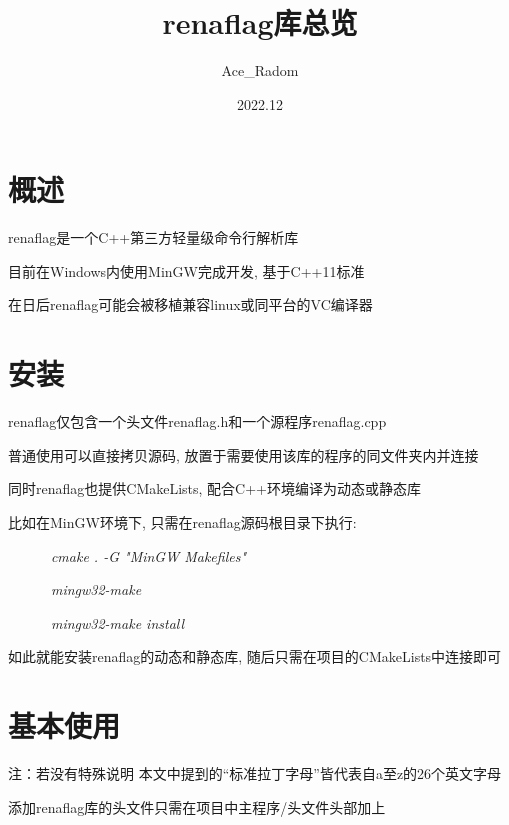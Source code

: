 \documentclass[12pt , a4paper , oneside]{ctexart}
\title{renaflag库总览}
\author{Ace\_Radom}
\date{2022.12}
\begin{document}
    \maketitle

    \newpage

    \section{概述}

        renaflag是一个C++第三方轻量级命令行解析库
        
        目前在Windows内使用MinGW完成开发, 基于C++11标准

        在日后renaflag可能会被移植兼容linux或同平台的VC编译器

    \newpage

    \section{安装}

        renaflag仅包含一个头文件\textcolor{file}{renaflag.h}和一个源程序\textcolor{file}{renaflag.cpp}

        普通使用可以直接拷贝源码, 放置于需要使用该库的程序的同文件夹内并连接

        同时renaflag也提供CMakeLists, 配合C++环境编译为动态或静态库

        比如在MinGW环境下, 只需在renaflag源码根目录下执行:

        \textit{\ \ \ \ \ \ cmake . -G "MinGW Makefiles"}

        \textit{\ \ \ \ \ \ mingw32-make}
        
        \textit{\ \ \ \ \ \ mingw32-make install}

        如此就能安装renaflag的动态和静态库, 随后只需在项目的CMakeLists中连接即可
    
    \newpage

    \section{基本使用}

        \small
        
        注：若没有特殊说明 本文中提到的“标准拉丁字母”皆代表自a至z的26个英文字母
        
        \dotfill
        \normalsize
        
        添加renaflag库的头文件只需在项目中主程序/头文件头部加上
\end{document}
